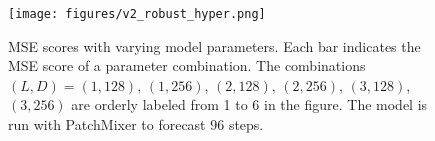 \documentclass{article} \usepackage{iclr2024_conference,times}
\begin{document}
\begin{figure}[h]
\begin{center}
\texttt{[image: figures/v2\_robust\_hyper.png]}
\end{center}
\caption{MSE scores with varying model parameters. Each bar indicates the MSE score of a parameter combination. The combinations $(L, D) = (1,128)$, $(1,256)$, $(2,128)$, $(2,256)$, $(3,128)$, $(3,256)$ are orderly labeled from 1 to 6 in the figure. The model is run with PatchMixer to forecast $96$ steps.}
\label{fig::robustness}
\end{figure}
\end{document}
